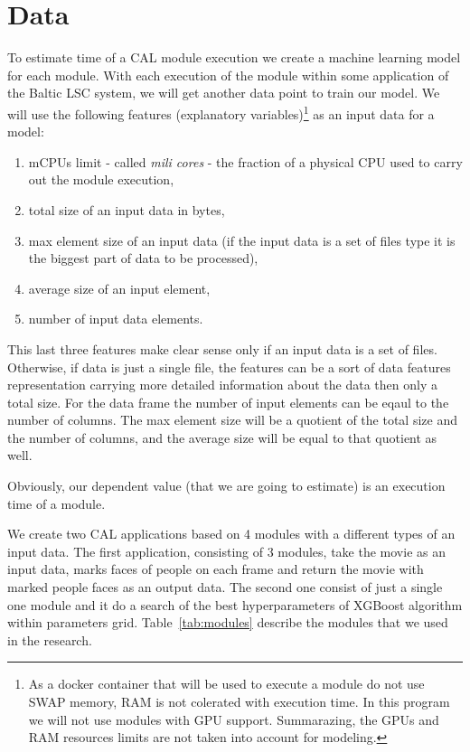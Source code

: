 \section{Data}

To estimate time of a CAL module execution we create a machine learning model for each module. With each execution of the module within some application of the Baltic LSC system, we will get another data point to train our model. We will use the following features (explanatory variables)\footnote{As a docker container that will be used to execute a module do not use SWAP memory, RAM is not colerated with execution time. In this program we will not use modules with GPU support. Summarazing, the GPUs and RAM resources limits are not taken into account for modeling.} as an input data for a model:
\begin{enumerate}
	\item mCPUs limit - called \textit{mili cores} - the fraction of a physical CPU used to carry out the module execution,
	\item total size of an input data in bytes,
	\item max element size of an input data (if the input data is a set of files type it is the biggest part of data to be processed),
	\item average size of an input element,
	\item number of input data elements.
\end{enumerate}
This last three features make clear sense only if an input data is a set of files. Otherwise, if data is just a single file, the features can be a sort of data features representation carrying more detailed information about the data then only a total size. For the data frame the number of input elements can be eqaul to the number of columns. The max element size will be a quotient of the total size and the number of columns, and the average size will be equal to that quotient as well.

Obviously, our dependent value (that we are going to estimate) is an execution time of a module.

We create two CAL applications based on 4 modules with a different types of an input data. The first application, consisting of 3 modules, take the movie as an input data, marks faces of people on each frame and return the movie with marked people faces as an output data. The second one consist of just a single one module and it do a search of the best hyperparameters of XGBoost algorithm within parameters grid. Table~\ref{tab:modules} describe the modules that we used in the research.

